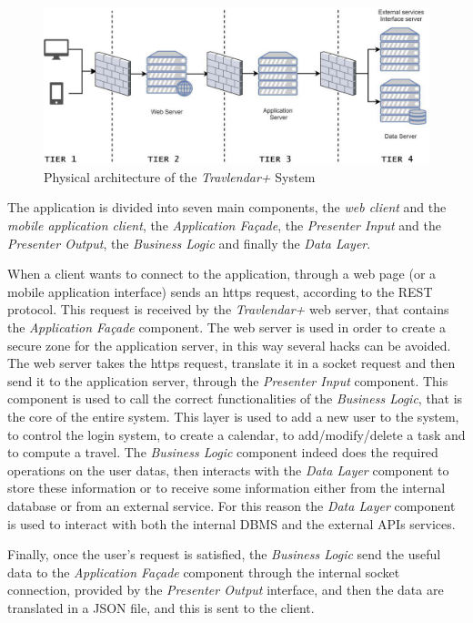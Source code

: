 \begin{figure}[H]
    \centering
    \includegraphics[scale=0.7]{Pictures/OverviewPictures/physical.jpg}
    \caption{Physical architecture of the \emph{Travlendar+} System}
\end{figure}

The application is divided into seven main components, the \emph{web client} and the \emph{mobile application client}, the \emph{Application Façade}, the \emph{Presenter Input} and the \emph{Presenter Output}, the \emph{Business Logic} and finally the \emph{Data Layer}.

When a client wants to connect to the application, through a web page (or a mobile application interface) sends an https request, according to the REST protocol. This request is received by the \emph{Travlendar+} web server, that contains the \emph{Application Façade} component. The web server is used in order to create a secure zone for the application server, in this way several hacks can be avoided. The web server takes the https request, translate it in a socket request and then send it to the application server, through the \emph{Presenter Input} component. This component is used to call the correct functionalities of the \emph{Business Logic}, that is the core of the entire system. This layer is used to add a new user to the system, to control the login system, to create a calendar, to add/modify/delete a task and to compute a travel. The \emph{Business Logic} component indeed does the required operations on the user datas, then interacts with the \emph{Data Layer} component to store these information or to receive some information either from the internal database or from an external service. For this reason the \emph{Data Layer} component is used to interact with both the internal DBMS and the external APIs services.

Finally, once the user's request is satisfied, the \emph{Business Logic} send the useful data to the \emph{Application Façade} component through the internal socket connection, provided by the \emph{Presenter Output} interface, and then the data are translated in a JSON file, and this is sent to the client.